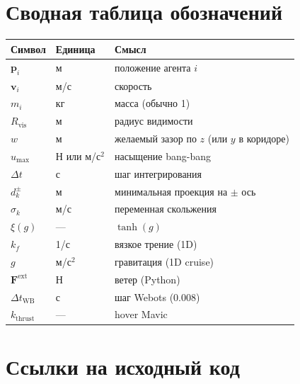 \documentclass[a4paper,11pt]{article}
\newcommand{\vect}[1]{\bm{#1}}
\begin{document}
\section{Сводная таблица обозначений}

\begin{center}
\renewcommand{\arraystretch}{1.2}
\begin{tabular}{|l|l|l|}
\hline
\textbf{Символ} & \textbf{Единица} & \textbf{Смысл} \\
\hline
$\vect{p}_i$ & м & положение агента $i$ \\
$\vect{v}_i$ & м/с & скорость \\
$m_i$ & кг & масса (обычно 1) \\
$R_{\mathrm{vis}}$ & м & радиус видимости \\
$w$ & м & желаемый зазор по $z$ (или $y$ в коридоре) \\
$u_{\max}$ & Н или м/с$^2$ & насыщение bang-bang \\
$\Delta t$ & с & шаг интегрирования \\
$d_k^\pm$ & м & минимальная проекция на $\pm$ ось \\
$\sigma_k$ & м/с & переменная скольжения \\
$\xi(g)$ & --- & $\tanh(g)$ \\
$k_f$ & 1/с & вязкое трение (1D) \\
$g$ & м/с$^2$ & гравитация (1D cruise) \\
$\vect{F}^{\mathrm{ext}}$ & Н & ветер (Python) \\
$\Delta t_{\mathrm{WB}}$ & с & шаг Webots (0.008) \\
$k_{\mathrm{thrust}}$ & --- & hover Mavic \\
\hline
\end{tabular}
\end{center}

\section{Ссылки на исходный код}
\end{document}
